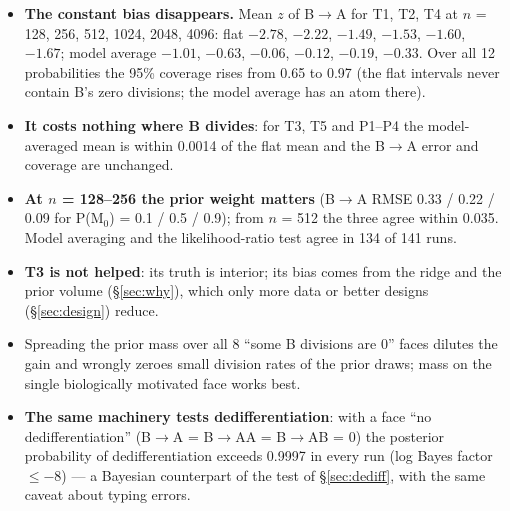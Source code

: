 \documentclass[10pt,a4paper]{article}
\newcommand{\BA}{B$\to$A}
\begin{document}
\begin{itemize}
\item \textbf{The constant bias disappears.} Mean $z$ of \BA{} for T1, T2, T4 at $n$ = 128, 256, 512, 1024, 2048, 4096: flat $-2.78$, $-2.22$, $-1.49$, $-1.53$, $-1.60$, $-1.67$; model average $-1.01$, $-0.63$, $-0.06$, $-0.12$, $-0.19$, $-0.33$. Over all 12 probabilities the 95\% coverage rises from 0.65 to 0.97 (the flat intervals never contain B's zero divisions; the model average has an atom there).
\item \textbf{It costs nothing where B divides}: for T3, T5 and P1--P4 the model-averaged mean is within 0.0014 of the flat mean and the \BA{} error and coverage are unchanged.
\item \textbf{At $n$ = 128--256 the prior weight matters} (\BA{} RMSE 0.33 / 0.22 / 0.09 for P(M$_0$) = 0.1 / 0.5 / 0.9); from $n$ = 512 the three agree within 0.035. Model averaging and the likelihood-ratio test agree in 134 of 141 runs.
\item \textbf{T3 is not helped}: its truth is interior; its bias comes from the ridge and the prior volume (\S\ref{sec:why}), which only more data or better designs (\S\ref{sec:design}) reduce.
\item Spreading the prior mass over all 8 ``some B divisions are 0'' faces dilutes the gain and wrongly zeroes small division rates of the prior draws; mass on the single biologically motivated face works best.
\item \textbf{The same machinery tests dedifferentiation}: with a face ``no dedifferentiation'' (\BA{} = B$\to$AA = B$\to$AB = 0) the posterior probability of dedifferentiation exceeds 0.9997 in every run (log Bayes factor $\le -8$) --- a Bayesian counterpart of the test of \S\ref{sec:dediff}, with the same caveat about typing errors.
\end{itemize}
\end{document}
